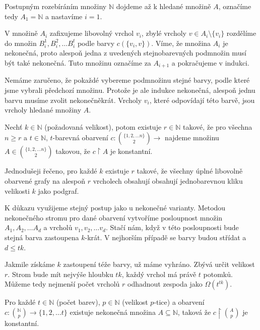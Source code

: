 \begin{t_proof}
  Postupným rozebíráním množiny $\mathbb{N}$ dojdeme až k hledané množině $A$, označíme tedy $A_1=\mathbb{N}$ a nastavíme $i=1$.

  V množině $A_i$ zafixujeme libovolný vrchol $v_i$, zbylé vrcholy $v\in A_i\setminus\{v_i\}$ rozdělíme do množin $B_i^1, B_i^2,\dots B_i^t$ podle barvy $c(\{v_i, v\})$. Víme, že množina $A_i$ je nekonečná, proto alespoň jedna z uvedených stejnobarevných podmnožin musí být také nekonečná. Tuto množinu označíme za $A_{i+1}$ a pokračujeme v indukci.

  Nemáme zaručeno, že pokaždé vybereme podmnožinu stejné barvy, podle které jsme vybrali předchozí množinu. Protože je ale indukce nekonečná, alespoň jednu barvu musíme zvolit nekonečněkrát. Vrcholy $v_i$, které odpovídají této barvě, jsou vrcholy hledané množiny $A$.
\end{t_proof}

\begin{t_theorem}
  Nechť $k\in\mathbb{N}$ (požadovaná velikost), potom existuje $r\in\mathbb{N}$ takové, že pro všechna $n\geq r$ a $t\in\mathbb{N}$, $t$-barevná obarvení $c:\binom{\{1,2,\dots n\}}{2}\rightarrow$ najdeme množinu $A\in\binom{\{1,2,\dots n\}}{2}$ takovou, že $c\restriction A$ je konstantní.
\end{t_theorem}
\begin{t_remark}
  Jednodušeji řečeno, pro každé $k$ existuje $r$ takové, že všechny úplné libovolně obarvené grafy na alespoň $r$ vrcholech obsahují obsahují jednobarevnou kliku velikosti $k$ jako podgraf.
\end{t_remark}

\begin{t_proof}
  K důkazu využijeme stejný postup jako u nekonečné varianty. Metodou nekonečného stromu pro dané obarvení vytvoříme posloupnost množin $A_1, A_2,\dots A_d$ a vrcholů $v_1, v_2,\dots v_d$. Stačí nám, když v této posloupnosti bude stejná barva zastoupena $k$-krát. V nejhorším případě se barvy budou střídat a $d\leq tk$.

  Jakmile získáme $k$ zastoupení téže barvy, už máme vyhráno. Zbývá určit velikost $r$. Strom bude mít nejvýše hloubku $tk$, každý vrchol má právě $t$ potomků. Můžeme tedy nejmenší počet vrcholů $r$ odhadnout zespoda jako $\Omega(t^{tk})$. 
\end{t_proof}

\begin{t_theorem}
  Pro každé $t\in\mathbb{N}$ (počet barev), $p\in\mathbb{N}$ (velikost $p$-tice) a obarvení $c:\binom{\mathbb{N}}{p}\rightarrow\{1,2,\dots t\}$ existuje nekonečná množina $A\subseteq\mathbb{N}$, taková že $c\restriction\binom{A}{p}$ je konstantní.
\end{t_theorem}

